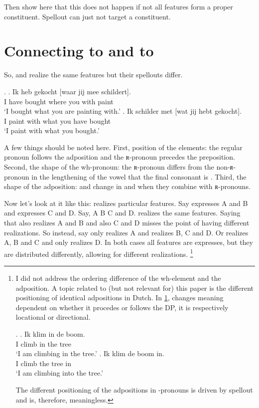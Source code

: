 \documentclass{article}
\begin{document}
Then show here that this does not happen if not all features form a proper constituent. Spellout can just not target a constituent.





\section{Connecting  to  and  to }

So,  and  realize the same features but their spellouts differ.

\ex.
\ag. Ik heb gekocht [waar jij mee schildert].\\
 I have bought where you with paint\\
 `I bought what you are painting with.'
\bg. Ik schilder met [wat jij hebt gekocht].\\
 I paint with what you have bought\\
 `I paint with what you bought.'

A few things should be noted here. First, position of the elements: the regular pronoun follows the adposition and the ʀ-pronoun precedes the preposition. Second, the shape of the wh-pronoun: the ʀ-pronoun differs from the non-ʀ-pronoun in the lengthening of the vowel that the final consonant is . Third, the shape of the adposition:  and  change in  and  when they combine with ʀ-pronouns.

Now let's look at it like this:  realizes particular features. Say  expresses A and B and  expresses C and D. Say, A B C and D.  realizes the same features. Saying that  also realizes A and B and  also C and D misses the point of having different realizations. So instead, say  only realizes A and  realizes B, C and D. Or  realizes A, B and C and  only realizes D. In both cases all features are expresses, but they are distributed differently, allowing for different realizations.
\footnote{I did not address the ordering difference of the wh-element and the adposition. A topic related to (but not relevant for) this paper is the different positioning of identical adpositions in Dutch. In \ref{ex:dutchin},  changes meaning dependent on whether it procedes or follows the DP, it is respectively locational or directional.

\ex.\label{ex:dutchin}
\ag. Ik klim in de boom.\\
 I climb in the tree\\
 `I am climbing in the tree.'
\bg. Ik klim de boom in.\\
 I climb the tree in\\
 `I am climbing into the tree.'

The different positioning of the adpositions in -pronouns is driven by spellout and is, therefore, meaningless.}
\end{document}
